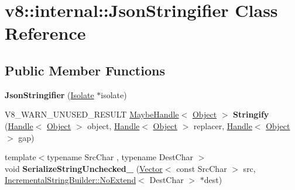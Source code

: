 \hypertarget{classv8_1_1internal_1_1JsonStringifier}{}\section{v8\+:\+:internal\+:\+:Json\+Stringifier Class Reference}
\label{classv8_1_1internal_1_1JsonStringifier}
\subsection*{Public Member Functions}
\begin{DoxyCompactItemize}
\item 
\mbox{\label{classv8_1_1internal_1_1JsonStringifier_a71c82f04fc406193f0dd903b97b58bc0}} 
{\bfseries Json\+Stringifier} (\mbox{\hyperlink{classv8_1_1internal_1_1Isolate}{Isolate}} $\ast$isolate)
\item 
\mbox{\label{classv8_1_1internal_1_1JsonStringifier_a632c3ea4234fbe174ce05292c45654b5}} 
V8\+\_\+\+W\+A\+R\+N\+\_\+\+U\+N\+U\+S\+E\+D\+\_\+\+R\+E\+S\+U\+LT \mbox{\hyperlink{classv8_1_1internal_1_1MaybeHandle}{Maybe\+Handle}}$<$ \mbox{\hyperlink{classv8_1_1internal_1_1Object}{Object}} $>$ {\bfseries Stringify} (\mbox{\hyperlink{classv8_1_1internal_1_1Handle}{Handle}}$<$ \mbox{\hyperlink{classv8_1_1internal_1_1Object}{Object}} $>$ object, \mbox{\hyperlink{classv8_1_1internal_1_1Handle}{Handle}}$<$ \mbox{\hyperlink{classv8_1_1internal_1_1Object}{Object}} $>$ replacer, \mbox{\hyperlink{classv8_1_1internal_1_1Handle}{Handle}}$<$ \mbox{\hyperlink{classv8_1_1internal_1_1Object}{Object}} $>$ gap)
\item 
\mbox{\label{classv8_1_1internal_1_1JsonStringifier_a392d19639ee7faf3a178f71d2e908291}} 
{\footnotesize template$<$typename Src\+Char , typename Dest\+Char $>$ }\\void {\bfseries Serialize\+String\+Unchecked\+\_\+} (\mbox{\hyperlink{classv8_1_1internal_1_1Vector}{Vector}}$<$ const Src\+Char $>$ src, \mbox{\hyperlink{classv8_1_1internal_1_1IncrementalStringBuilder_1_1NoExtend}{Incremental\+String\+Builder\+::\+No\+Extend}}$<$ Dest\+Char $>$ $\ast$dest)
\item 
\mbox{\label{classv8_1_1internal_1_1JsonStringifier_acf1b09782cc5e9ecc75fb69d2985704e}} 

\end{DoxyCompactItemize}
